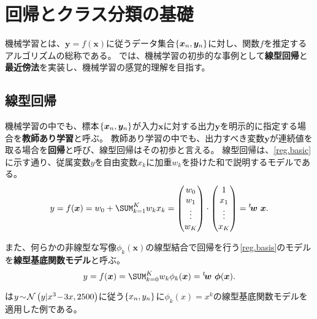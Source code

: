 \documentclass[10pt,a4paper]{book}
\begin{document}
\maketitle
\tableofcontents

\chapter{回帰とクラス分類の基礎\label{chap:intro}}

機械学習とは、$\bm{y}=f(\bm{x})$に従うデータ集合$\seq{\bm{x}_n,\bm{y}_n}$に対し、関数$f$を推定するアルゴリズムの総称である。
では、機械学習の初歩的な事例として\textbf{線型回帰}と\textbf{最近傍法}を実装し、機械学習の感覚的理解を目指す。

\section{線型回帰\label{sect:intro.reg}}

機械学習の中でも、標本$\seq{\bm{x}_n,\bm{y}_n}$が入力$\bm{x}$に対する出力$\bm{y}$を明示的に指定する場合を\textbf{教師あり学習}と呼ぶ。
教師あり学習の中でも、出力すべき変数$\bm{y}$が連続値を取る場合を\textbf{回帰}と呼び、線型回帰はその初歩と言える。
線型回帰は、\eqref{reg.basic}に示す通り、従属変数$y$を自由変数$x_k$に加重$w_k$を掛けた和で説明するモデルである。
%
\begin{equation}
\label{eq:reg.basic}
y = f(\bm{x}) = w_0 + \sum_{k=1}^K w_k x_k
= \begin{pmatrix} w_0 \\ w_1 \\ \vdots \\ w_K\end{pmatrix} \cdot \begin{pmatrix} 1 \\ x_1 \\ \vdots \\ x_K\end{pmatrix}
= \trans{\bm{w}} \bm{x}.
\end{equation}

また、何らかの非線型な写像$\phi_k(\bm{x})$の線型結合で回帰を行う\eqref{reg.basis}のモデルを\textbf{線型基底関数モデル}と呼ぶ。
%
\begin{equation}
\label{eq:reg.basis}
y = f(\bm{x}) = \sum_{k=0}^K w_k \phi_k(\bm{x}) = \trans{\bm{w}}\bm{\phi}(\bm{x}).
\end{equation}

は$y\!\sim\!\mathcal{N}\left(y|x^3\!-\!3x,2500\right)$に従う$\seq{x_n,y_n}$に$\phi_k(x)\!=\!x^k$の線型基底関数モデルを適用した例である。
\end{document}
